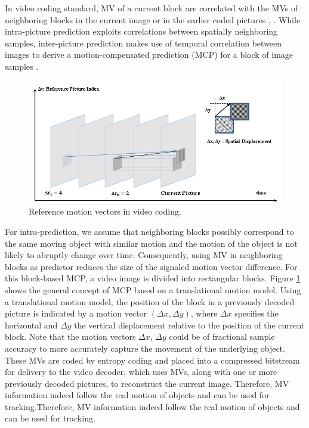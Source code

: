  In video coding standard, MV of a current block are correlated with the MVs of neighboring blocks in the current image or in the earlier coded pictures \cite{laroche2008rd}, \cite{jiang2019spatial}. While intra-picture prediction exploits correlations between spatially neighboring samples, inter-picture prediction makes use of temporal correlation between images to derive a motion-compensated prediction (MCP) for a block of image samples \cite{bross2014inter}.
\begin{figure}
\centering
 \includegraphics[width=0.8\linewidth]{Figures/mv.png}
 \caption{ Reference motion vectors in video coding.}
 \label{fig:mv}
\end{figure}
For intra-prediction, we assume that neighboring blocks possibly correspond to the same moving object with similar motion and the motion of the object is not likely to abruptly change over time. Consequently, using MV in neighboring blocks as predictor reduces the size of the signaled motion vector difference. For this block-based MCP, a video image is divided into rectangular blocks. Figure \ref{fig:mv} shows the general concept of MCP based on a translational motion model. Using a translational motion model, the position of the block in a previously decoded picture is indicated by a motion vector $(\Delta x, \Delta y)$, where $\Delta x$ specifies the horizontal and $\Delta y$ the vertical displacement relative to the position of the current block. Note that the motion vectors $\Delta x$, $\Delta y$ could be of fractional sample accuracy to more accurately capture the movement of the underlying object. These MVs are coded by entropy coding and placed into a compressed bitstream for delivery to the video decoder, which uses MVs, along with one or more previously decoded pictures, to reconstruct the current image. Therefore, MV information indeed follow the real motion of objects and can be used for tracking.Therefore, MV information indeed follow the real motion of objects and can be used for tracking.\\
